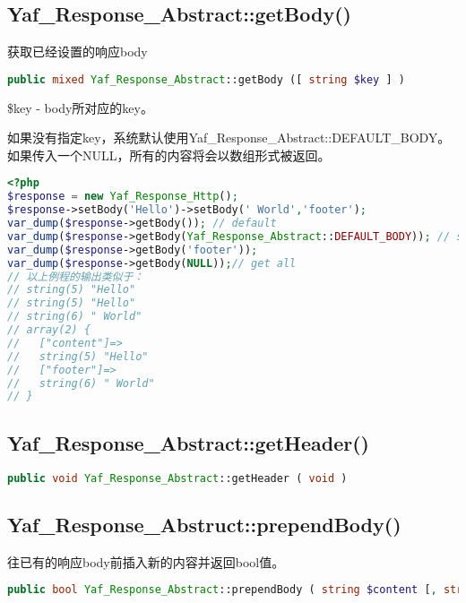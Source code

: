 \subsection{Yaf\_Response\_Abstract::getBody()}

获取已经设置的响应body


\begin{lstlisting}[language=PHP]
public mixed Yaf_Response_Abstract::getBody ([ string $key ] )
\end{lstlisting}

\begin{compactitem}
\item\$key - body所对应的key。

如果没有指定key，系统默认使用Yaf\_Response\_Abstract::DEFAULT\_BODY。如果传入一个NULL，所有的内容将会以数组形式被返回。
\end{compactitem}

\begin{lstlisting}[language=PHP]
<?php
$response = new Yaf_Response_Http();
$response->setBody('Hello')->setBody(' World','footer');
var_dump($response->getBody()); // default
var_dump($response->getBody(Yaf_Response_Abstract::DEFAULT_BODY)); // same as above
var_dump($response->getBody('footer'));
var_dump($response->getBody(NULL));// get all
// 以上例程的输出类似于：
// string(5) "Hello"
// string(5) "Hello"
// string(6) " World"
// array(2) {
//   ["content"]=>
//   string(5) "Hello"
//   ["footer"]=>
//   string(6) " World"
// }
\end{lstlisting}


\subsection{Yaf\_Response\_Abstract::getHeader()}

\begin{lstlisting}[language=PHP]
public void Yaf_Response_Abstract::getHeader ( void )
\end{lstlisting}



\subsection{Yaf\_Response\_Abstruct::prependBody()}

往已有的响应body前插入新的内容并返回bool值。

\begin{lstlisting}[language=PHP]
public bool Yaf_Response_Abstract::prependBody ( string $content [, string $key ] )
\end{lstlisting}

